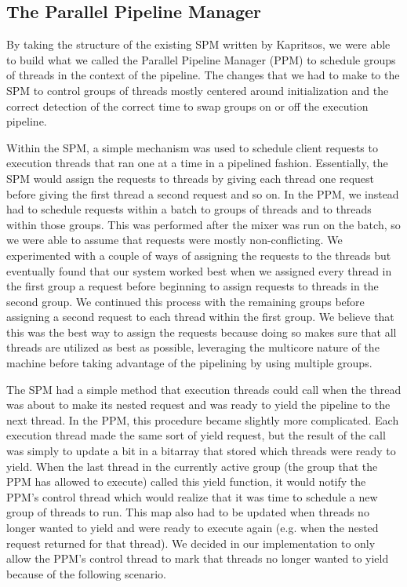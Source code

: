 \documentclass[11pt, oneside]{report}
\begin{document}
\subsection{The Parallel Pipeline Manager}

By taking the structure of the existing SPM written by Kapritsos, we were able to build what we called the Parallel Pipeline Manager (PPM) to schedule groups of threads in the context of the pipeline. 
The changes that we had to make to the SPM to control groups of threads mostly centered around initialization and the correct detection of the correct time to swap groups on or off the execution pipeline.

Within the SPM, a simple mechanism was used to schedule client requests to execution threads that ran one at a time in a pipelined fashion. 
Essentially, the SPM would assign the requests to threads by giving each thread one request before giving the first thread a second request and so on. 
In the PPM, we instead had to schedule requests within a batch to groups of threads and to threads within those groups. 
This was performed after the mixer was run on the batch, so we were able to assume that requests were mostly non-conflicting. 
We experimented with a couple of ways of assigning the requests to the threads but eventually found that our system worked best when we assigned every thread in the first group a request before beginning to assign requests to threads in the second group. 
We continued this process with the remaining groups before assigning a second request to each thread within the first group. 
We believe that this was the best way to assign the requests because doing so makes sure that all threads are utilized as best as possible, leveraging the multicore nature of the machine before taking advantage of the pipelining by using multiple groups.

The SPM had a simple method that execution threads could call when the thread was about to make its nested request and was ready to yield the pipeline to the next thread. 
In the PPM, this procedure became slightly more complicated. 
Each execution thread made the same sort of yield request, but the result of the call was simply to update a bit in a bitarray that stored which threads were ready to yield. 
When the last thread in the currently active group (the group that the PPM has allowed to execute) called this yield function, it would notify the PPM's control thread which would realize that it was time to schedule a new group of threads to run. 
This map also had to be updated when threads no longer wanted to yield and were ready to execute again (e.g. 
when the nested request returned for that thread). 
We decided in our implementation to only allow the PPM's control thread to mark that threads no longer wanted to yield because of the following scenario. 
\end{document}
